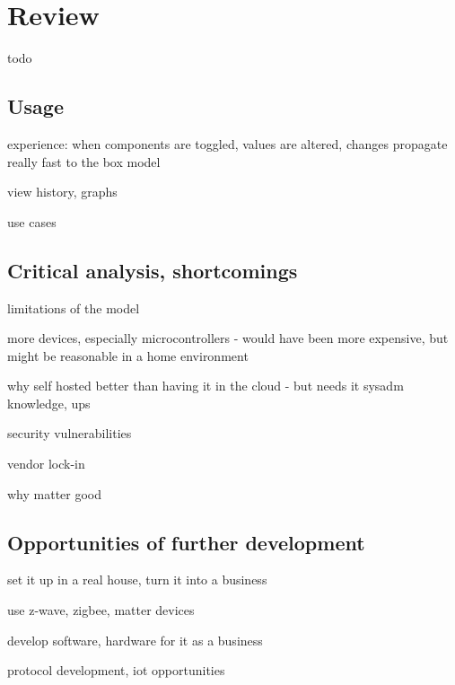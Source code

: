 \chapter{Review} %

todo

\section{Usage}

experience: when components are toggled, values are altered, changes propagate really fast to the box model

view history, graphs

use cases

\section{Critical analysis, shortcomings}

limitations of the model

more devices, especially microcontrollers - would have been more expensive, but might be reasonable in a home environment

why self hosted better than having it in the cloud - but needs it sysadm knowledge, ups

security vulnerabilities

vendor lock-in

why matter good

\section{Opportunities of further development}

set it up in a real house, turn it into a business

use z-wave, zigbee, matter devices

develop software, hardware for it as a business

protocol development, iot opportunities

